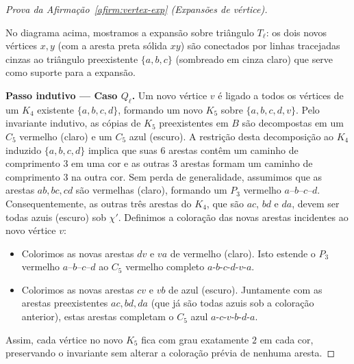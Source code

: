 \documentclass[reqno, 12pt]{amsart}
\numberwithin{equation}{section}
\theoremstyle{plain}
\theoremstyle{definition}
\begin{document}
\begin{proof}[Prova da Afirmação~\ref{afirm:vertex-exp} (Expansões de vértice)]
\begin{center}
    \end{center}
    \noindent
    No diagrama acima, mostramos a expansão sobre triângulo $T_\ell$: os dois novos vértices $x, y$ (com a aresta preta sólida $xy$) são conectados por linhas tracejadas cinzas ao triângulo preexistente $\{a,b,c\}$ (sombreado em cinza claro) que serve como suporte para a expansão.

    \medskip\noindent\textbf{Passo indutivo --- Caso $Q_\ell$.}
    Um novo vértice $v$ é ligado a todos os vértices de um $K_4$ existente $\{a,b,c,d\}$, formando um novo $K_5$ sobre $\{a,b,c,d,v\}$.
    Pelo invariante indutivo, as cópias de $K_5$ preexistentes em $B$ são decompostas em um $C_5$ vermelho (claro) e um $C_5$ azul (escuro). A restrição desta decomposição ao $K_4$ induzido $\{a,b,c,d\}$ implica que suas $6$ arestas contêm um caminho de comprimento $3$ em uma cor e as outras $3$ arestas formam um caminho de comprimento $3$ na outra cor.
    Sem perda de generalidade, assumimos que as arestas $ab, bc, cd$ são vermelhas (claro), formando um $P_3$ vermelho $a$--$b$--$c$--$d$.
    Consequentemente, as outras três arestas do $K_4$, que são $ac$, $bd$ e $da$, devem ser todas azuis (escuro) sob $\chi'$.
    Definimos a coloração das novas arestas incidentes ao novo vértice $v$:
    \begin{itemize}
        \item Colorimos as novas arestas $dv$ e $va$ de vermelho (claro). Isto estende o $P_3$ vermelho $a$--$b$--$c$--$d$ ao $C_5$ vermelho completo $a\text{-}b\text{-}c\text{-}d\text{-}v\text{-}a$.
        \item Colorimos as novas arestas $cv$ e $vb$ de azul (escuro). Juntamente com as arestas preexistentes $ac, bd, da$ (que já são todas azuis sob a coloração anterior), estas arestas completam o $C_5$ azul $a\text{-}c\text{-}v\text{-}b\text{-}d\text{-}a$.
    \end{itemize}
    Assim, cada vértice no novo $K_5$ fica com grau exatamente $2$ em cada cor, preservando o invariante sem alterar a coloração prévia de nenhuma aresta.


\end{proof}
\end{document}

